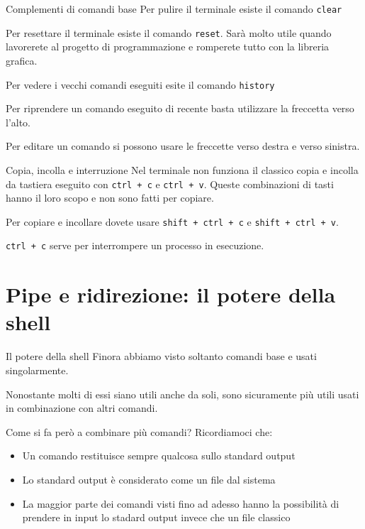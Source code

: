 \documentclass{beamer}
\begin{document}
\begin{frame}{Complementi di comandi base}
  Per pulire il terminale esiste il comando \texttt{clear}\bigskip

  Per resettare il terminale esiste il comando \texttt{reset}. Sarà molto utile
  quando lavorerete al progetto di programmazione e romperete tutto con 
  la libreria grafica.\bigskip

  Per vedere i vecchi comandi eseguiti esite il comando \texttt{history}\bigskip

  Per riprendere un comando eseguito di recente basta utilizzare la freccetta
  verso l'alto.\bigskip

  Per editare un comando si possono usare le freccette verso destra e verso 
  sinistra.\bigskip
\end{frame}

\begin{frame}{Copia, incolla e interruzione}
  Nel terminale non funziona il classico copia e incolla da tastiera eseguito
  con \texttt{ctrl + c} e \texttt{ctrl + v}. Queste combinazioni di tasti hanno 
  il loro scopo e non sono fatti per copiare.\bigskip

  Per copiare e incollare dovete usare \texttt{shift + ctrl + c} e 
  \texttt{shift + ctrl + v}.\bigskip

  \texttt{ctrl + c} serve per interrompere un processo in esecuzione.
\end{frame}

\section{Pipe e ridirezione: il potere della shell}
\begin{frame}{Il potere della shell}
  Finora abbiamo visto soltanto comandi base e usati singolarmente.\bigskip

  Nonostante molti di essi siano utili anche da soli, sono sicuramente più 
  utili usati in combinazione con altri comandi.\bigskip

  Come si fa però a combinare più comandi? \pause
  Ricordiamoci che:
  \begin{itemize}
    \item <2-> Un comando restituisce sempre qualcosa sullo standard output
    \item <3-> Lo standard output è considerato come un file dal sistema
    \item <4-> La maggior parte dei comandi visti fino ad adesso hanno la 
      possibilità di prendere in input lo stadard output invece che un file 
      classico
  \end{itemize}
\end{frame}
\end{document}
